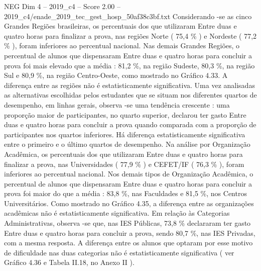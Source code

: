 \begin{textsample}{NEG Dim 4 – 2019\_c4 – Score 2.00 – 2019\_c4/enade\_2019\_tec\_gest\_hosp\_50af38c3bf.txt}
Considerando -se as cinco Grandes Regiões brasileiras, os percentuais dos que utilizaram Entre duas e quatro horas para finalizar a prova, nas regiões Norte ( 75,4 \% ) e Nordeste ( 77,2 \% ), foram inferiores ao percentual nacional.
Nas demais Grandes Regiões, o percentual de alunos que dispensaram Entre duas e quatro horas para concluir a prova foi mais elevado que a média : 81,2 \%, na região Sudeste, 80,3 \%, na região Sul e 80,9 \%, na região Centro-Oeste, como mostrado no Gráfico 4.33.
A diferença entre as regiões não é estatisticamente significativa.
Uma vez analisadas as alternativas escolhidas pelos estudantes que se situam nos diferentes quartos de desempenho, em linhas gerais, observa -se uma tendência crescente : uma proporção maior de participantes, no quarto superior, declarou ter gasto Entre duas e quatro horas para concluir a prova quando comparada com a proporção de participantes nos quartos inferiores.
Há diferença estatisticamente significativa entre o primeiro e o último quartos de desempenho.
Na análise por Organização Acadêmica, os percentuais dos que utilizaram Entre duas e quatro horas para finalizar a prova, nas Universidades ( 77,9 \% ) e CEFET/IF ( 76,3 \% ), foram inferiores ao percentual nacional.
Nos demais tipos de Organização Acadêmica, o percentual de alunos que dispensaram Entre duas e quatro horas para concluir a prova foi maior do que a média : 83,8 \%, nas Faculdades e 81,5 \%, nos Centros Universitários.
Como mostrado no Gráfico 4.35, a diferença entre as organizações acadêmicas não é estatisticamente significativa.
Em relação às Categorias Administrativas, observa -se que, nas IES Públicas, 73,8 \% declararam ter gasto Entre duas e quatro horas para concluir a prova, sendo 80,7 \%, nas IES Privadas, com a mesma resposta.
A diferença entre os alunos que optaram por esse motivo de dificuldade nas duas categorias não é estatisticamente significativa ( ver Gráfico 4.36 e Tabela II.18, no Anexo II ).

\end{textsample}
